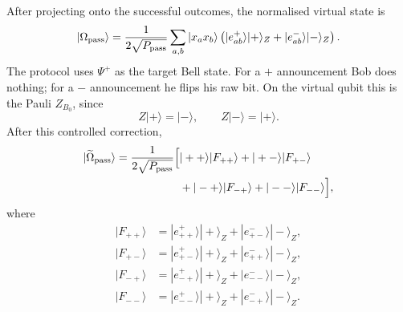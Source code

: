 \documentclass[11pt]{article}
\theoremstyle{remark}
\begin{document}
After projecting onto the successful outcomes, the normalised virtual state
is
\begin{equation}
    |\Omega_{\rm pass}\rangle
    =
    \frac{1}{2\sqrt{P_{\rm pass}}}
    \sum_{a,b}
    |x_a x_b\rangle
    \left(
      |e^+_{ab}\rangle|+\rangle_Z
      +
      |e^-_{ab}\rangle|-\rangle_Z
    \right).
    \label{eq:a7-pass-state}
\end{equation}
The protocol uses \(\Psi^+\) as the target Bell state.  For a \(+\)
announcement Bob does nothing; for a \(-\) announcement he flips his raw bit.
On the virtual qubit this is the Pauli \(Z_{B_0}\), since
\[
    Z|+\rangle=|-\rangle,
    \qquad
    Z|-\rangle=|+\rangle.
\]
After this controlled correction,
\begin{equation}
\begin{aligned}
    |\widetilde\Omega_{\rm pass}\rangle
    =
    \frac{1}{2\sqrt{P_{\rm pass}}}
    \Big[&
    |++\rangle |F_{++}\rangle
    +|+-\rangle |F_{+-}\rangle\\
    &+|-+\rangle |F_{-+}\rangle
    +|--\rangle |F_{--}\rangle
    \Big],
    \label{eq:a7-corrected-state}
\end{aligned}
\end{equation}
where
\begin{align}
    |F_{++}\rangle
    &=
    |e^+_{++}\rangle|+\rangle_Z
    +
    |e^-_{+-}\rangle|-\rangle_Z,\\
    |F_{+-}\rangle
    &=
    |e^+_{+-}\rangle|+\rangle_Z
    +
    |e^-_{++}\rangle|-\rangle_Z,\\
    |F_{-+}\rangle
    &=
    |e^+_{-+}\rangle|+\rangle_Z
    +
    |e^-_{--}\rangle|-\rangle_Z,\\
    |F_{--}\rangle
    &=
    |e^+_{--}\rangle|+\rangle_Z
    +
    |e^-_{-+}\rangle|-\rangle_Z.
    \label{eq:a7-F-vectors}
\end{align}
\end{document}
